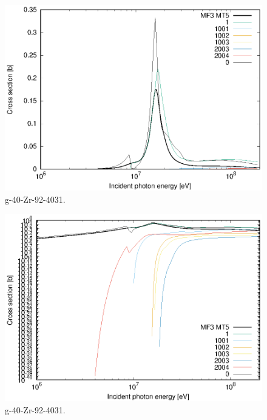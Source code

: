 \begin{figure}
 \includegraphics[width=\linewidth]{eps/g_40-Zr-92_4031.eps}
  \caption{g-40-Zr-92-4031.}
\end{figure}
\begin{figure}
 \includegraphics[width=\linewidth]{eps-log/g_40-Zr-92_4031.eps}
 \caption{g-40-Zr-92-4031.}
\end{figure}
\newpage \clearpage

